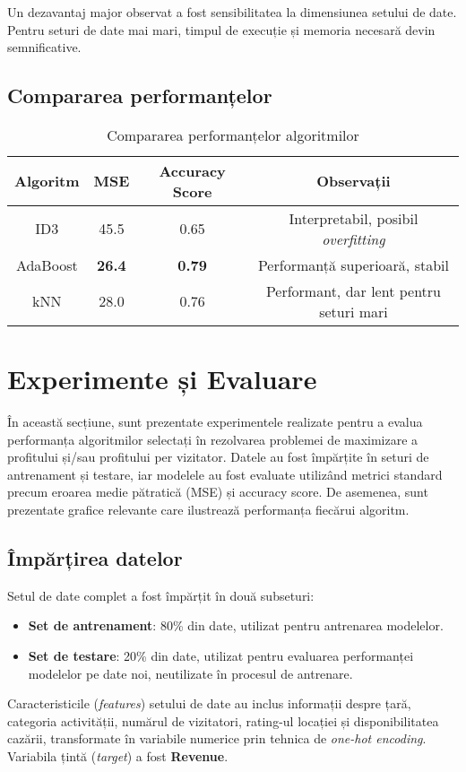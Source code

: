 \documentclass{article}
\begin{document}
Un dezavantaj major observat a fost sensibilitatea la dimensiunea setului de date. Pentru seturi de date mai mari, timpul de execuție și memoria necesară devin semnificative.\\


\subsection*{Compararea performanțelor}

\begin{table}[H]
\centering
\begin{tabular}{|c|c|c|c|}
\hline
\textbf{Algoritm} & \textbf{MSE} & \textbf{Accuracy Score} & \textbf{Observații} \\ \hline
ID3               & 45.5                        & 0.65                      & Interpretabil, posibil \textit{overfitting} \\ \hline
AdaBoost          & \textbf{26.4}                 & \textbf{0.79}             & Performanță superioară, stabil \\ \hline
kNN               & 28.0                          & 0.76                      & Performant, dar lent pentru seturi mari \\ \hline
\end{tabular}
\caption{Compararea performanțelor algoritmilor}
\end{table}

\section*{Experimente și Evaluare}

În această secțiune, sunt prezentate experimentele realizate pentru a evalua performanța algoritmilor selectați în rezolvarea problemei de maximizare a profitului și/sau profitului per vizitator. Datele au fost împărțite în seturi de antrenament și testare, iar modelele au fost evaluate utilizând metrici standard precum eroarea medie pătratică (MSE) și accuracy score. De asemenea, sunt prezentate grafice relevante care ilustrează performanța fiecărui algoritm.

\subsection*{Împărțirea datelor}
Setul de date complet a fost împărțit în două subseturi:
\begin{itemize}
    \item \textbf{Set de antrenament}: 80\% din date, utilizat pentru antrenarea modelelor.
    \item \textbf{Set de testare}: 20\% din date, utilizat pentru evaluarea performanței modelelor pe date noi, neutilizate în procesul de antrenare.
\end{itemize}
Caracteristicile (\textit{features}) setului de date au inclus informații despre țară, categoria activității, numărul de vizitatori, rating-ul locației și disponibilitatea cazării, transformate în variabile numerice prin tehnica de \textit{one-hot encoding}. Variabila țintă (\textit{target}) a fost \textbf{Revenue}.
\end{document}
